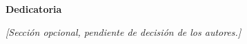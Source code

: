 \clearpage
    \thispagestyle{plain}
    \begin{center}
        \vspace*{2cm}
        \textbf{Dedicatoria}
        
        \vspace{0.8cm}
        \textit{[Sección opcional, pendiente de decisión de los autores.]}
        
        \vspace{15cm}
    \end{center}
\clearpage
